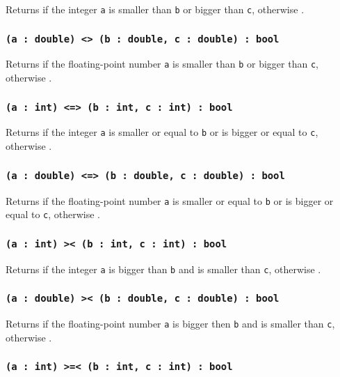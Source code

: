 Returns \true{} if the integer \texttt{a} is smaller than \texttt{b} or bigger than \texttt{c}, otherwise \false{}.

\subsubsection{\texttt{(a : double) <> (b : double, c : double) : bool}}

Returns \true{} if the floating-point number \texttt{a} is smaller than \texttt{b} or bigger than \texttt{c}, otherwise \false{}.

\subsubsection{\texttt{(a : int) <=> (b : int, c : int) : bool}}

Returns \true{} if the integer \texttt{a} is smaller or equal to \texttt{b} or is bigger or equal to \texttt{c}, otherwise \false{}.

\subsubsection{\texttt{(a : double) <=> (b : double, c : double) : bool}}

Returns \true{} if the floating-point number \texttt{a} is smaller or equal to \texttt{b} or is bigger or equal to \texttt{c}, otherwise \false{}.

\subsubsection{\texttt{(a : int) >< (b : int, c : int) : bool}}

Returns \true{} if the integer \texttt{a} is bigger than \texttt{b} and is smaller than \texttt{c}, otherwise \false{}.

\subsubsection{\texttt{(a : double) >< (b : double, c : double) : bool}}

Returns \true{} if the floating-point number \texttt{a} is bigger then \texttt{b} and is smaller than \texttt{c}, otherwise \false{}.

\subsubsection{\texttt{(a : int) >=< (b : int, c : int) : bool}}

